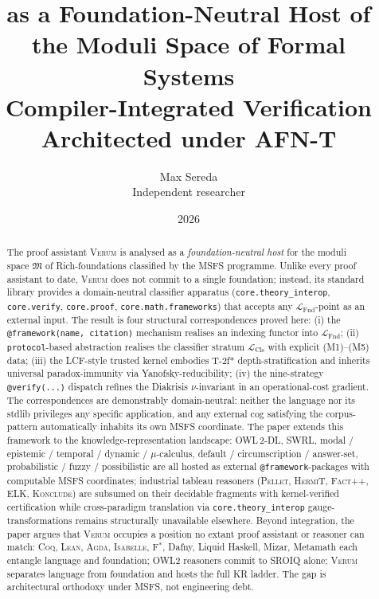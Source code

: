 \documentclass[11pt, a4paper]{article}
\title{%
    \LARGE \textbf{\Verum{} as a Foundation-Neutral Host of the Moduli Space of Formal Systems} \\[4pt]
    \large Compiler-Integrated Verification Architected under AFN-T
}
\author{Max Sereda \\ \small Independent researcher}
\date{2026}
\theoremstyle{definition}
\theoremstyle{remark}
\newcommand{\fM}{\mathfrak{M}}
\newcommand{\LFnd}{\mathcal{L}_{\mathrm{Fnd}}}
\newcommand{\LCls}{\mathcal{L}_{\mathrm{Cls}}}
\newcommand{\Verum}{\textsc{Verum}}
\newcommand{\Coq}{\textsc{Coq}}
\newcommand{\Lean}{\textsc{Lean}}
\newcommand{\Agda}{\textsc{Agda}}
\newcommand{\Isabelle}{\textsc{Isabelle}}
\newcommand{\Fstar}{\textsc{F$^\ast$}}
\newcommand{\Pellet}{\textsc{Pellet}}
\newcommand{\HermiT}{\textsc{HermiT}}
\newcommand{\FactPP}{\textsc{Fact++}}
\newcommand{\ELK}{\textsc{ELK}}
\newcommand{\Konclude}{\textsc{Konclude}}
\newcommand{\OWL}{\textsc{OWL\,2}}
\newcommand{\SWRL}{\textsc{SWRL}}
\begin{document}
\maketitle

\begin{abstract}
\noindent
The proof assistant \Verum{} is analysed as a \emph{foundation-neutral host} for the moduli space $\fM$ of Rich-foundations classified by the MSFS programme. Unlike every proof assistant to date, \Verum{} does not commit to a single foundation; instead, its standard library provides a domain-neutral classifier apparatus (\texttt{core.theory\_interop}, \texttt{core.verify}, \texttt{core.proof}, \texttt{core.math.frameworks}) that accepts any $\LFnd$-point as an external input. The result is four structural correspondences proved here: (i) the \texttt{@framework(name, citation)} mechanism realises an indexing functor into $\LFnd$; (ii) \texttt{protocol}-based abstraction realises the classifier stratum $\LCls$ with explicit (M1)--(M5) data; (iii) the LCF-style trusted kernel embodies T-2f* depth-stratification and inherits universal paradox-immunity via Yanofsky-reducibility; (iv) the nine-strategy \texttt{@verify(...)} dispatch refines the Diakrisis $\nu$-invariant in an operational-cost gradient. The correspondences are demonstrably domain-neutral: neither the language nor its stdlib privileges any specific application, and any external cog satisfying the corpus-pattern automatically inhabits its own MSFS coordinate. The paper extends this framework to the knowledge-representation landscape: \OWL-\textsc{DL}, \SWRL, modal / epistemic / temporal / dynamic / $\mu$-calculus, default / circumscription / answer-set, probabilistic / fuzzy / possibilistic are all hosted as external \texttt{@framework}-packages with computable MSFS coordinates; industrial tableau reasoners (\Pellet, \HermiT, \FactPP, \ELK, \Konclude) are subsumed on their decidable fragments with kernel-verified certification while cross-paradigm translation via \texttt{core.theory\_interop} gauge-transformations remains structurally unavailable elsewhere. Beyond integration, the paper argues that \Verum{} occupies a position no extant proof assistant or reasoner can match: \Coq, \Lean, \Agda, \Isabelle, \Fstar, Dafny, Liquid Haskell, Mizar, Metamath each entangle language and foundation; OWL2 reasoners commit to SROIQ alone; \Verum{} separates language from foundation and hosts the full KR ladder. The gap is architectural orthodoxy under MSFS, not engineering debt.
\end{abstract}
\end{document}
